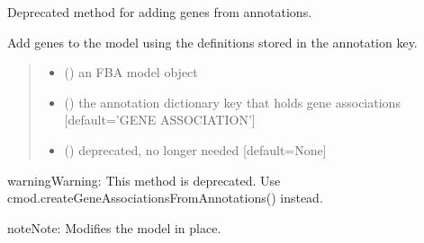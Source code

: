 \documentclass[letterpaper,12pt,english]{sphinxmanual}
\begin{document}
\begin{fulllineitems}
\label{\detokenize{api/core:cbmpy.CBTools.addGenesFromAnnotations}}
\pysigstartsignatures
\pysiglinewithargsret
{}
{\sphinxparamcomma {}\sphinxparamcomma {}}
{}
\pysigstopsignatures
\sphinxAtStartPar
Deprecated method for adding genes from annotations.

\sphinxAtStartPar
Add genes to the model using the definitions stored in the annotation key.
\begin{quote}\begin{description}
\begin{itemize}
\item {} 
\sphinxAtStartPar
{} () \textendash{} an FBA model object

\item {} 
\sphinxAtStartPar
{} (\sphinxstyleliteralemphasis{\sphinxupquote{, }}) \textendash{} the annotation dictionary key that holds gene associations {[}default=’GENE ASSOCIATION’{]}

\item {} 
\sphinxAtStartPar
{} (\sphinxstyleliteralemphasis{\sphinxupquote{, }}) \textendash{} deprecated, no longer needed {[}default=None{]}

\end{itemize}

\end{description}\end{quote}

\begin{sphinxadmonition}{warning}{Warning:}
\sphinxAtStartPar
This method is deprecated. Use cmod.createGeneAssociationsFromAnnotations() instead.
\end{sphinxadmonition}

\begin{sphinxadmonition}{note}{Note:}
\sphinxAtStartPar
Modifies the model in place.
\end{sphinxadmonition}

\end{fulllineitems}
\end{document}
